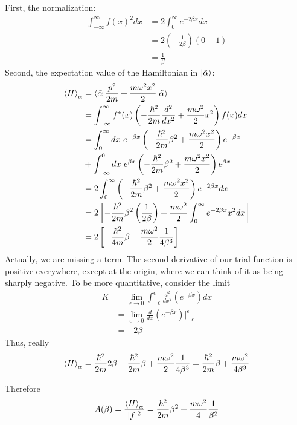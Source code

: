\documentclass[12pt, letterpaper]{article}
\begin{document}
\begin{enumerate}
    First, the normalization:
    \begin{align}
            \int_{-\infty}^\infty f(x)^2dx&=2\int_0^\infty e^{-2\beta x}dx\\&=2\left(-\frac{1}{2\beta}\right)\left(0-1\right)\\&=\frac{1}{\beta}
    \end{align}
    Second, the expectation value of the Hamiltonian in $\ket{\tilde{\alpha}}$:
    \begin{align}
            \braket{H}_{\alpha}&=\braket{\tilde{\alpha}|\frac{p^2}{2m}+\frac{m\omega^2x^2}{2}|\tilde{\alpha}}\\&=\int_{-\infty}^\infty f^*(x)\left(-\frac{\hbar^2}{2m}\frac{d^2}{dx^2}+\frac{m\omega^2}{2}x^2\right)f(x)dx\\&=\int_0^\infty dx\text{ }e^{-\beta x}\left(-\frac{\hbar^2}{2m}\beta^2+\frac{m\omega^2 x^2}{2}\right)e^{-\beta x}\\&+\int_{-\infty}^0 dx\text{ }e^{\beta x}\left(-\frac{\hbar^2}{2m}\beta^2+\frac{m\omega^2x^2}{2}\right)e^{\beta x}\\&=2\int_0^\infty \left(-\frac{\hbar^2}{2m}\beta^2+\frac{m\omega^2x^2}{2}\right)e^{-2\beta x}dx\\&=2\left[-\frac{\hbar^2}{2m}\beta^2\left(\frac{1}{2\beta}\right)+\frac{m\omega^2}{2}\int_0^\infty e^{-2\beta x}x^2dx\right]\\&=2\left[-\frac{\hbar^2}{4m}\beta+\frac{m\omega^2}{2}\frac{1}{4\beta^3}\right]
    \end{align}
    Actually, we are missing a term. The second derivative of our trial function is positive everywhere, except at the origin, where we can think of it as being sharply negative. To be more quantitative, 
    consider the limit
    \begin{align}
            K&=\lim_{\epsilon\to 0}\int_{-\epsilon}^\epsilon \frac{d^2}{dx^2}\left(e^{-\beta x}\right)dx\\&=\lim_{\epsilon\to0}\frac{d}{dx}\left(e^{-\beta x}\right)\biggr\rvert_{-\epsilon}^{\epsilon}\\&=-2\beta
    \end{align}
    Thus, really
    \begin{equation}
            \braket{H}_{\alpha}=\frac{\hbar^2}{2m}2\beta-\frac{\hbar^2}{2m}\beta+\frac{m\omega^2}{2}\frac{1}{4\beta^3}=\frac{\hbar^2}{2m}\beta+\frac{m\omega^2}{4\beta^3}
    \end{equation}
    
    Therefore
    \begin{equation}
            A(\beta)=\frac{\braket{H}_{\alpha}}{|f|^2}=\frac{\hbar^2}{2m}\beta^2+\frac{m\omega^2}{4}\frac{1}{\beta^2}
    \end{equation}
    

\end{enumerate}
\end{document}
